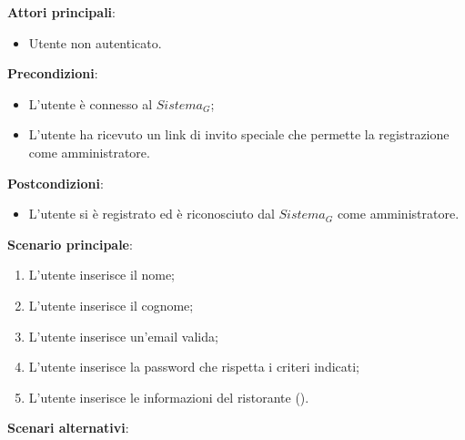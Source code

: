 \textbf{Attori principali}: 
\begin{itemize}
    \item Utente non autenticato.
\end{itemize}
\textbf{Precondizioni}:
\begin{itemize}
    \item L'utente è connesso al $\textit{Sistema}_G$;
    \item L'utente ha ricevuto un link di invito speciale che permette la registrazione come amministratore.
\end{itemize}
\textbf{Postcondizioni}: 
\begin{itemize}
    \item L'utente si è registrato ed è riconosciuto dal $\textit{Sistema}_G$ come amministratore.
\end{itemize}
\textbf{Scenario principale}:
\begin{enumerate}
    \item L'utente inserisce il nome;
    \item L'utente inserisce il cognome;
    \item L'utente inserisce un'email valida;
    \item L'utente inserisce la password che rispetta i criteri indicati;
    \item L'utente inserisce le informazioni del ristorante ().
\end{enumerate}
\textbf{Scenari alternativi}:
